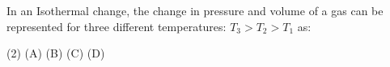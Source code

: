 \item In an Isothermal change, the change in pressure and volume of a gas can be represented for three different temperatures: \( T_3 > T_2 > T_1 \) as:
    \begin{center}
    \end{center}
    \begin{tasks}(2)
        \task (A)
        \task (B)
        \task (C)
        \task (D)
    \end{tasks}